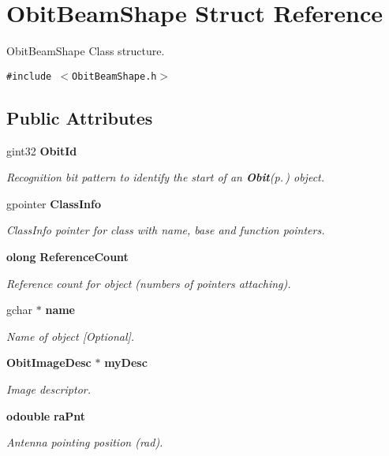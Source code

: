 \section{Obit\-Beam\-Shape Struct Reference}
\label{structObitBeamShape}
Obit\-Beam\-Shape Class structure.  


{\tt \#include $<$Obit\-Beam\-Shape.h$>$}

\subsection*{Public Attributes}
\begin{CompactItemize}
\item 
gint32 {\bf Obit\-Id}
\begin{CompactList}\small\item\em Recognition bit pattern to identify the start of an {\bf Obit}{\rm (p.\,\pageref{structObit})} object. \item\end{CompactList}\item 
gpointer {\bf Class\-Info}
\begin{CompactList}\small\item\em Class\-Info pointer for class with name, base and function pointers. \item\end{CompactList}\item 
{\bf olong} {\bf Reference\-Count}
\begin{CompactList}\small\item\em Reference count for object (numbers of pointers attaching). \item\end{CompactList}\item 
gchar $\ast$ {\bf name}
\begin{CompactList}\small\item\em Name of object [Optional]. \item\end{CompactList}\item 
{\bf Obit\-Image\-Desc} $\ast$ {\bf my\-Desc}
\begin{CompactList}\small\item\em Image descriptor. \item\end{CompactList}\item 
{\bf odouble} {\bf ra\-Pnt}
\begin{CompactList}\small\item\em Antenna pointing position (rad). \item\end{CompactList}\item 

\end{CompactItemize}
